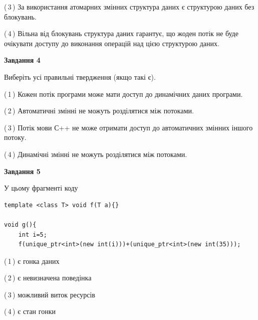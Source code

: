 \documentclass[12pt, ukrainian]{article}
\begin{document}
\begin {large}
{(\,3\,) За використання атомарних змінних структура даних є структурою даних без блокувань.%

(\,4\,) Вільна від блокувань структура даних гарантує, що жоден потік не буде очікувати доступу до виконання операцій над цією структурою даних.%



\begin{center}
\textbf{Завдання 4}
\end{center}
Виберіть усі правильні твердження (якщо такі є).\par
\vspace{2mm}

(\,1\,) Кожен потік програми може мати доступ до динамічних даних програми.%

(\,2\,) Автоматичні змінні не можуть розділятися між потоками.%

(\,3\,) Потік мови С++ не може отримати доступ до автоматичних змінних іншого потоку.%

(\,4\,) Динамічні змінні не можуть розділятися між потоками.%



\begin{center}
\textbf{Завдання 5}
\end{center}
У цьому фрагменті коду
\begin{verbatim}
template <class T> void f(T a){}

void g(){
    int i=5;
    f(unique_ptr<int>(new int(i)))+(unique_ptr<int>(new int(35)));
\end{verbatim}
(\,1\,) є гонка даних%

(\,2\,) є невизначена поведінка%

(\,3\,) можливий виток ресурсів%

(\,4\,) є стан гонки%


}
\end {large}
\end{document}
